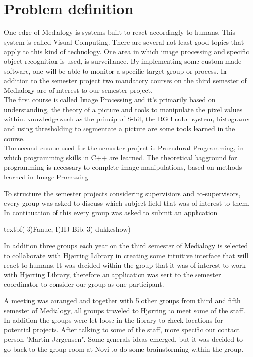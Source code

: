 \chapter{Problem definition}
One edge of Medialogy is systems built to react accordingly to humans. This system is called Visual Computing. There are several not least good topics that apply to this kind of technology. One area in which image processing and specific object recognition is used, is surveillance. By implementing some custom made software, one will be able to monitor a specific target group or process. In addition to the semester project two mandatory courses on the third semester of Medialogy are of interest to our semester project.\\
The first course is called Image Processing and it's primarily based on understanding, the theory of a picture and tools to manipulate the pixel values within. knowledge such as the princip of 8-bit, the RGB color system, histograms and using thresholding to segmentate a picture are some tools learned in the course.\\
The second course used for the semester project is Procedural Programming, in which programming skills in C++ are learned. The theoretical bagground for programming is necessary to complete image manipulations, based on methods learned in Image Processing.

To structure the semester projects considering supervisiors and co-supervisors, every group was asked to discuss which subject field that was of interest to them. In continuation of this every group was asked to submit an application

textbf{( 3)Fanuc, 1)HJ Bib, 3) dukkeshow)}



In addition three groups each year on the third semester of Medialogy is selected to collaborate with Hjørring Library in creating some intuitive interface that will react to humans. It was decided within the group that it was of interest to work with Hjørring Library, therefore an application was sent to the semester coordinator to consider our group as one participant.

A meeting was arranged and together with 5 other groups from third and fifth semester of Medialogy, all groups traveled to Hjørring to meet some of the staff. In addition the groups were let loose in the library to check locations for potential projects. After talking to some of the staff, more specific our contact person "Martin Jørgensen". Some generals ideas emerged, but it was decided to go back to the group room at Novi to do some brainstorming within the group.

